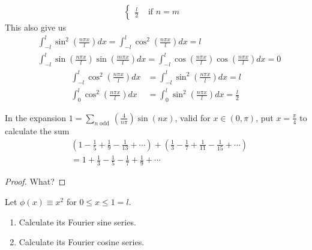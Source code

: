 \documentclass{report}
\begin{document}
\begin{mdframed}
\begin{align*}
\begin{cases}
  \frac{l}{2}& \text{ if $n=m$ }
\end{cases}
\end{align*}
This also give us 
\begin{align*}
&\int_{-l}^{l} \sin^2 (\frac{n \pi  x}{l})dx=\int_{-l}^{l}\cos^2 ( \frac{n\pi  x}{l})dx=l\\
&\int_{-l}^{l} \sin (\frac{n \pi  x}{l})\sin (\frac{m \pi  x}{l})dx=\int_{-l}^l \cos( \frac{n \pi  x}{l})\cos (\frac{n \pi  x}{l})dx=0
\end{align*}
\begin{align*}
  \int_{-l}^{l} \cos^2 (\frac{n \pi  x}{l})dx&= \int_{-l}^{l}\sin ^2 (\frac{n \pi  x}{l})dx= l\\
 \int_0^l \cos^2 (\frac{n \pi  x}{l})dx&=\int_0^l \sin^2 (\frac{n \pi  x}{l})dx=\frac{l}{2} 
\end{align*}

\end{mdframed}
\begin{question}{}{}
In the expansion $1=\sum_{n\operatorname{ odd}}(\frac{4}{n\pi})\sin (nx)$, valid for $x\in (0,\pi)$, put $x= \frac{\pi}{4}$ to calculate the sum 
\begin{align*}
  &(1-\frac{1}{5}+\frac{1}{9}-\frac{1}{13}+\cdots) + (\frac{1}{3}-\frac{1}{7}+\frac{1}{11}-\frac{1}{15}+\cdots) \\
  &= 1+ \frac{1}{3} - \frac{1}{5} - \frac{1}{7} + \frac{1}{9} + \cdots 
\end{align*}
\end{question}
\begin{proof}
What? 
\end{proof}
\begin{question}{}{}
Let $\phi (x)\equiv x^2$ for $0\leq x\leq 1=l$. 
\begin{enumerate}[label=(\alph*)]
  \item Calculate its Fourier sine series. 
  \item Calculate its Fourier cosine series. 
\end{enumerate}
\end{question}
\end{document}
